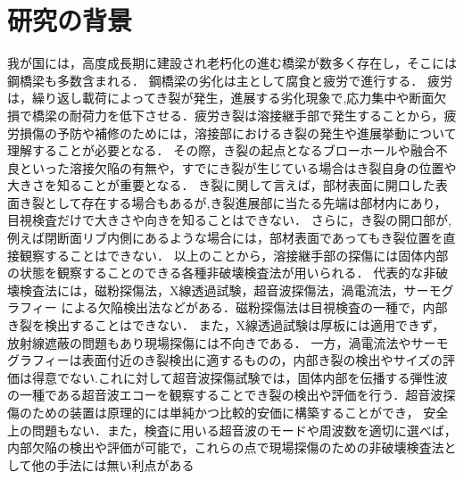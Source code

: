 ﻿%
\section{研究の背景}
%
%
我が国には，高度成長期に建設され老朽化の進む橋梁が数多く存在し，そこには鋼橋梁も多数含まれる． 
鋼橋梁の劣化は主として腐食と疲労で進行する．
疲労は，繰り返し載荷によってき裂が発生，進展する劣化現象で,応力集中や断面欠損で橋梁の耐荷力を低下させる．疲労き裂は溶接継手部で発生することから，疲労損傷の予防や補修のためには，溶接部におけるき裂の発生や進展挙動について理解することが必要となる\cite{Miki}．
その際，き裂の起点となるブローホールや融合不良といった溶接欠陥の有無や，すでにき裂が生じている場合はき裂自身の位置や大きさを知ることが重要となる．
き裂に関して言えば，部材表面に開口した表面き裂として存在する場合もあるが,き裂進展部に当たる先端は部材内にあり，目視検査だけで大きさや向きを知ることはできない．
さらに，き裂の開口部が,例えば閉断面リブ内側にあるような場合には，部材表面であってもき裂位置を直接観察することはできない．
以上のことから，溶接継手部の探傷には固体内部の状態を観察することのできる各種非破壊検査法が用いられる．
代表的な非破壊検査法には，磁粉探傷法，X線透過試験，超音波探傷法，渦電流法，サーモグラフィー
による欠陥検出法などがある．磁粉探傷法は目視検査の一種で，内部き裂を検出することはできない．
また，X線透過試験は厚板には適用できず，放射線遮蔽の問題もあり現場探傷には不向きである．
一方，渦電流法やサーモグラフィーは表面付近のき裂検出に適するものの，内部き裂の検出やサイズの評価は得意でない.これに対して超音波探傷試験では，固体内部を伝播する弾性波の一種である超音波エコーを観察することでき裂の検出や評価を行う．超音波探傷のための装置は原理的には単純かつ比較的安価に構築することができ，
安全上の問題もない．また，検査に用いる超音波のモードや周波数を適切に選べば，内部欠陥の検出や評価が可能で，これらの点で現場探傷のための非破壊検査法として他の手法には無い利点がある\\

